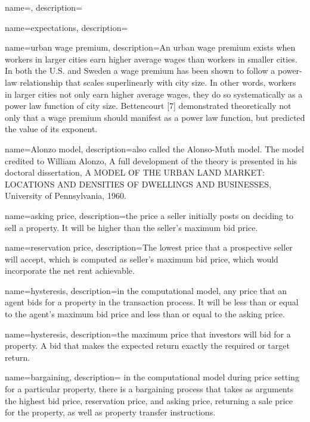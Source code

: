 {
name=,
description={ }
}

{
name=expectations,
description={ }
}

{
name=urban wage premium,
description={An urban wage premium exists when workers in larger cities earn higher average wages than workers in smaller cities. In both the U.S.  and Sweden a wage premium has been shown to follow a power-law relationship that scales superlinearly with city size. In other words, workers in larger cities not only earn higher average wages, they do so systematically as a power law function of city size. Bettencourt [7] demonstrated theoretically not only that a wage premium should manifest as a power law function, but predicted the value of its exponent. }
}

{
name=Alonzo model,
description={also called the Alonso-Muth model. The model credited to William Alonzo, A full development of the theory is presented in his doctoral dissertation, A MODEL OF THE URBAN LAND MARKET: LOCATIONS AND DENSITIES OF DWELLINGS AND BUSINESSES, University of Pennsylvania, 1960. }
}

{
name=asking price,
description={the price a seller initially posts on deciding to sell a property. It will be higher than the seller's maximum bid price.}
}

{
name=reservation  price,
description={The lowest price that a prospective seller will accept, which is computed as  seller's maximum bid price, which would incorporate the net rent achievable.}
}

{
name=hysteresis,
description={in  the computational model, any price that an agent bids for a property in the transaction process. It will be less than or equal to the agent's maximum bid price and less than or equal to the asking price.}
}

{
name=hysteresis,
description={the maximum price that investors will bid for a property. A bid that makes the expected return exactly the required or  target return.}
}

{
name=bargaining,
description= {in the computational model during price setting for a particular property, there is a bargaining process that takes as arguments the highest bid price, reservation price, and asking price, returning a sale price for the property, as well as property transfer instructions.}
}



